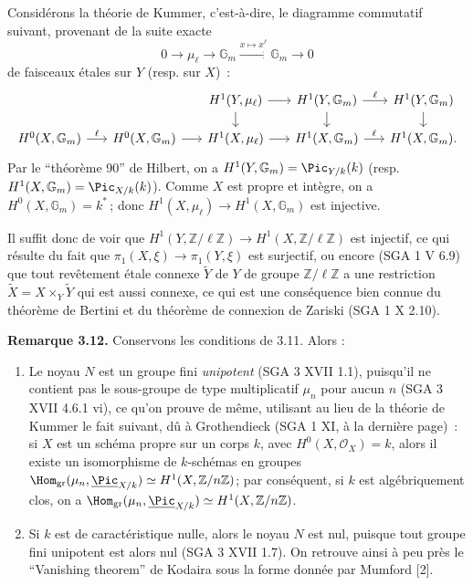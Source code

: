 Consid\'erons la th\'eorie de Kummer, c'est-\`a-dire, le diagramme commutatif suivant, provenant de la suite exacte
\[
0\longrightarrow\mu_\ell\longrightarrow\mathbb G_m
\xrightarrow{x\mapsto x^\ell}\mathbb G_m\longrightarrow0
\]
de faisceaux \'etales sur \(Y\) (resp. sur \(X\))~:
\[
\begin{tikzcd}[column sep=1.6em,row sep=1.2em]
& & H^1(Y,\mu_\ell)\arrow[r]\arrow[d]&H^1(Y,\mathbb G_m)\arrow[r,"\ell"]\arrow[d]&H^1(Y,\mathbb G_m)\arrow[d]\\
H^0(X,\mathbb G_m)\arrow[r,"\ell"]&H^0(X,\mathbb G_m)\arrow[r]&H^1(X,\mu_\ell)\arrow[r]&H^1(X,\mathbb G_m)\arrow[r,"\ell"]&H^1(X,\mathbb G_m).
\end{tikzcd}
\]
Par le ``th\'eor\`eme 90'' de Hilbert, on a \(H^1(Y,\mathbb G_m)=\Pic_{Y/k}(k)\) (resp. \(H^1(X,\mathbb G_m)=\Pic_{X/k}(k)\)). Comme \(X\) est propre et int\`egre, on a \(H^0(X,\mathbb G_m)=k^*\)\,; donc \(H^1(X,\mu_\ell)\to H^1(X,\mathbb G_m)\) est injective.

Il suffit donc de voir que \(H^1(Y,\mathbb Z/\ell\mathbb Z)\longrightarrow H^1(X,\mathbb Z/\ell\mathbb Z)\) est injectif, ce qui r\'esulte du fait que \(\pi_1(X,\xi)\to\pi_1(Y,\xi)\) est surjectif, ou encore (SGA 1 V 6.9) que tout rev\^etement \'etale connexe \(\widetilde Y\) de \(Y\) de groupe \(\mathbb Z/\ell\mathbb Z\) a une restriction \(\widetilde X=X\times_Y\widetilde Y\) qui est aussi connexe, ce qui est une cons\'equence bien connue du th\'eor\`eme de Bertini et du th\'eor\`eme de connexion de Zariski (SGA 1 X 2.10).

\textbf{Remarque 3.12.} Conservons les conditions de 3.11. Alors :
\begin{enumerate}[label=(\roman*)]
\item Le noyau \(N\) est un groupe fini \emph{unipotent} (SGA 3 XVII 1.1), puisqu'il ne contient pas le sous-groupe de type multiplicatif \(\mu_n\) pour aucun \(n\) (SGA 3 XVII 4.6.1 vi), ce qu'on prouve de m\^eme, utilisant au
lieu de la th\'eorie de Kummer le fait suivant, d\^u \`a Grothendieck (SGA 1 XI, \`a la derni\`ere page)~: si \(X\) est un sch\'ema propre sur un corps \(k\), avec \(H^0(X,\mathcal O_X)=k\), alors il existe un isomorphisme de \(k\)-sch\'emas en groupes \(\Hom_{\mathrm{gr}}(\mu_n,\underline{\Pic}_{X/k})\simeq H^1(X,\mathbb Z/n\mathbb Z)\); par cons\'equent, si \(k\) est alg\'ebriquement clos, on a \(\Hom_{\mathrm{gr}}(\mu_n,\underline{\Pic}_{X/k})\simeq H^1(X,\mathbb Z/n\mathbb Z)\).
\item Si \(k\) est de caract\'eristique nulle, alors le noyau \(N\) est nul, puisque tout groupe fini unipotent est alors nul (SGA 3 XVII 1.7). On retrouve ainsi \`a peu pr\`es le ``Vanishing theorem'' de Kodaira sous la forme donn\'ee par Mumford [2].
\end{enumerate}

